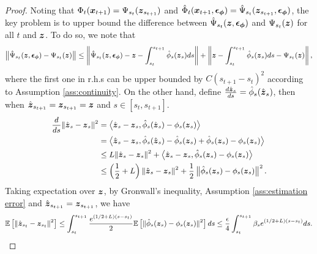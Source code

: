 \begin{proof}
	Noting that $\Phi_{t}(\boldsymbol{x}_{t + 1}) = \Psi_{s_t}(\boldsymbol{z}_{s_{t + 1}})$ and $\hat{\Phi}_{t}(\boldsymbol{x}_{t + 1}, \boldsymbol{\epsilon}_{\boldsymbol{\phi}}) = \hat{\Psi}_{s_{t}}(\boldsymbol{z}_{s_{t + 1}}, \boldsymbol{\epsilon}_{\boldsymbol{\phi}})$, the key problem is to upper bound the difference between $\hat{\Psi}_{s_{t}}(\boldsymbol{z}, \boldsymbol{\epsilon}_{\boldsymbol{\phi}})$ and $\Psi_{s_{t}}(\boldsymbol{z})$ for all $t$ and $\boldsymbol{z}$. To do so, we note that 
	\begin{equation}\label{eq:one step error}
		\small
		\left\|\hat{\Psi}_{s_{t}}(\boldsymbol{z}, \boldsymbol{\epsilon}_{\boldsymbol{\phi}}) - \Psi_{s_{t}}(\boldsymbol{z})\right\| \leq \left\|\hat{\Psi}_{s_{t}}(\boldsymbol{z}, \boldsymbol{\epsilon}_{\boldsymbol{\phi}}) - \boldsymbol{z} - \int_{s_{t}}^{s_{t + 1}}\hat{\phi}_{s}(\boldsymbol{z}_{s})ds\right\| + \left\|\boldsymbol{z} - \int_{s_{t}}^{s_{t + 1}}\hat{\phi}_{s}(\boldsymbol{z}_{s})ds - \Psi_{s_{t}}(\boldsymbol{z})\right\|,
	\end{equation}
	where the first one in r.h.s can be upper bounded by $C(s_{t + 1} - s_{t})^{2}$ according to Assumption \ref{ass:continuity}. On the other hand, define $\frac{d\hat{\boldsymbol{z}}_{s}}{ds} = \hat{\phi}_{s}(\hat{\boldsymbol{z}}_{s})$, then when $\hat{\boldsymbol{z}}_{s_{t + 1}} = \boldsymbol{z}_{s_{t + 1}} = \boldsymbol{z}$ and $s\in[s_{t}, s_{t + 1}]$.  
	\begin{equation}
		\small
		\begin{aligned}
			\frac{d}{ds}\|\hat{\boldsymbol{z}}_{s} - \boldsymbol{z}_{s}\|^{2} & = \left\langle\hat{\boldsymbol{z}}_{s} - \boldsymbol{z}_{s}, \hat{\phi}_{s}(\hat{\boldsymbol{z}}_{s}) - \phi_{s}(\boldsymbol{z}_{s})\right\rangle \\
			& = \left\langle\hat{\boldsymbol{z}}_{s} - \boldsymbol{z}_{s}, \hat{\phi}_{s}(\hat{\boldsymbol{z}}_{s}) - \hat{\phi}_{s}(\boldsymbol{z}_{s}) + \hat{\phi}_{s}(\boldsymbol{z}_{s}) - \phi_{s}(\boldsymbol{z}_{s})\right\rangle \\
			& \leq L\|\hat{\boldsymbol{z}}_{s} - \boldsymbol{z}_{s}\|^{2} + \left\langle\hat{\boldsymbol{z}}_{s} - \boldsymbol{z}_{s}, \hat{\phi}_{s}(\boldsymbol{z}_{s}) - \phi_{s}(\boldsymbol{z}_{s})\right\rangle \\
			& \leq \left(\frac{1}{2} + L\right)\|\hat{\boldsymbol{z}}_{s} - \boldsymbol{z}_{s}\|^{2} + \frac{1}{2}\left\|\hat{\phi}_{s}(\boldsymbol{z}_{s}) - \phi_{s}(\boldsymbol{z}_{s})\right\|^{2}. 
		\end{aligned}
	\end{equation}
	Taking expectation over $\boldsymbol{z}$, by Gronwall's inequality, Assumption \ref{ass:estimation error} and $\hat{\boldsymbol{z}}_{s_{t + 1}} = \boldsymbol{z}_{s_{t + 1}}$, we have 
	\begin{equation}
		\small
		\mathbb{E}\left[\|\hat{\boldsymbol{z}}_{s_{t}} - \boldsymbol{z}_{s_{t}}\|^{2}\right] \leq \int_{s_{t}}^{s_{t + 1}}\frac{e^{(1/2 + L)(s - s_{t})}}{2}\mathbb{E}\left[\|\hat{\phi}_{s}(\boldsymbol{z}_{s}) - \phi_{s}(\boldsymbol{z}_{s})\|^{2}\right]ds \leq \frac{\epsilon}{4}\int_{s_{t}}^{s_{t + 1}}\beta_{s}e^{(1/2 + L)(s - s_{t})}ds.
	\end{equation}

\end{proof}

